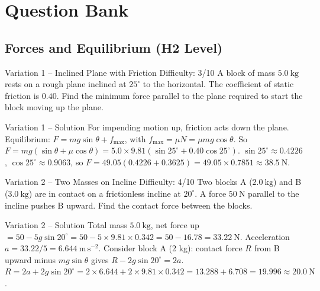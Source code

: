 \documentclass[11pt]{beamer}
\begin{document}
\section{Question Bank}


\subsection{Forces and Equilibrium (H2 Level)}

\begin{frame}[shrink=15]{Variation 1 – Inclined Plane with Friction \hfill Difficulty: 3/10}
A block of mass $5.0\ \mathrm{kg}$ rests on a rough plane inclined at $25^\circ$ to the horizontal. The coefficient of static friction is $0.40$. Find the minimum force parallel to the plane required to start the block moving up the plane.
\end{frame}

\begin{frame}{Variation 1 – Solution}
For impending motion up, friction acts down the plane. Equilibrium: $F = mg\sin\theta + f_{\max}$, with $f_{\max} = \mu N = \mu mg\cos\theta$.
So $F = mg(\sin\theta + \mu\cos\theta) = 5.0\times9.81(\sin25^\circ + 0.40\cos25^\circ)$.
$\sin25^\circ \approx 0.4226$, $\cos25^\circ \approx 0.9063$, so $F = 49.05(0.4226 + 0.3625) = 49.05\times0.7851 \approx 38.5\ \mathrm{N}$.
\end{frame}

\begin{frame}[shrink=15]{Variation 2 – Two Masses on Incline \hfill Difficulty: 4/10}
Two blocks A ($2.0\ \mathrm{kg}$) and B ($3.0\ \mathrm{kg}$) are in contact on a frictionless incline at $20^\circ$. A force $50\ \mathrm{N}$ parallel to the incline pushes B upward. Find the contact force between the blocks.
\end{frame}

\begin{frame}{Variation 2 – Solution}
Total mass $5.0\ \mathrm{kg}$, net force up $= 50 - 5g\sin20^\circ = 50 - 5\times9.81\times0.342 = 50 - 16.78 = 33.22\ \mathrm{N}$. Acceleration $a = 33.22/5 = 6.644\ \mathrm{m\,s^{-2}}$.
Consider block A (2 kg): contact force $R$ from B upward minus $mg\sin\theta$ gives $R - 2g\sin20^\circ = 2a$.
$R = 2a + 2g\sin20^\circ = 2\times6.644 + 2\times9.81\times0.342 = 13.288 + 6.708 = 19.996 \approx 20.0\ \mathrm{N}$.
\end{frame}
\end{document}
